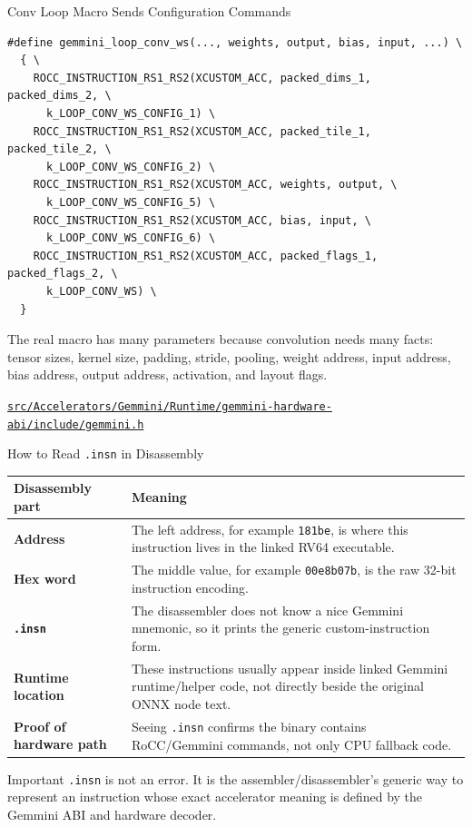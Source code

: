 \documentclass[aspectratio=169,10pt]{beamer}
\newcommand{\code}[1]{\texttt{\footnotesize #1}}
\newcommand{\repoRoot}{/home/lahcen/toolchains/onnx-mlir-xcompile/onnx-mlir}
\newcommand{\pathcode}[1]{\href{run:\repoRoot/#1}{\texttt{\scriptsize #1}}}
\newcommand{\edgeword}[1]{\textcolor{red!75!black}{\textbf{#1}}}
\begin{document}
\begin{frame}[fragile]{Conv Loop Macro Sends Configuration Commands}
  \begin{lstlisting}
#define gemmini_loop_conv_ws(..., weights, output, bias, input, ...) \
  { \
    ROCC_INSTRUCTION_RS1_RS2(XCUSTOM_ACC, packed_dims_1, packed_dims_2, \
      k_LOOP_CONV_WS_CONFIG_1) \
    ROCC_INSTRUCTION_RS1_RS2(XCUSTOM_ACC, packed_tile_1, packed_tile_2, \
      k_LOOP_CONV_WS_CONFIG_2) \
    ROCC_INSTRUCTION_RS1_RS2(XCUSTOM_ACC, weights, output, \
      k_LOOP_CONV_WS_CONFIG_5) \
    ROCC_INSTRUCTION_RS1_RS2(XCUSTOM_ACC, bias, input, \
      k_LOOP_CONV_WS_CONFIG_6) \
    ROCC_INSTRUCTION_RS1_RS2(XCUSTOM_ACC, packed_flags_1, packed_flags_2, \
      k_LOOP_CONV_WS) \
  }
  \end{lstlisting}
  \scriptsize
  The real macro has many parameters because convolution needs many facts:
  tensor sizes, kernel size, padding, stride, pooling, weight address, input address, bias address, output address, activation, and layout flags.

  \vspace{0.25em}
  \pathcode{src/Accelerators/Gemmini/Runtime/gemmini-hardware-abi/include/gemmini.h}
\end{frame}

\begin{frame}{How to Read \code{.insn} in Disassembly}
  \scriptsize
  \begin{tabularx}{\textwidth}{@{}lX@{}}
    \toprule
    Disassembly part & Meaning \\
    \midrule
    \edgeword{Address} & The left address, for example \code{181be}, is where this instruction lives in the linked RV64 executable. \\
    \edgeword{Hex word} & The middle value, for example \code{00e8b07b}, is the raw 32-bit instruction encoding. \\
    \edgeword{\code{.insn}} & The disassembler does not know a nice Gemmini mnemonic, so it prints the generic custom-instruction form. \\
    \edgeword{Runtime location} & These instructions usually appear inside linked Gemmini runtime/helper code, not directly beside the original ONNX node text. \\
    \edgeword{Proof of hardware path} & Seeing \code{.insn} confirms the binary contains RoCC/Gemmini commands, not only CPU fallback code. \\
    \bottomrule
  \end{tabularx}

  \vspace{0.45em}
  \begin{block}{Important}
    \code{.insn} is not an error. It is the assembler/disassembler's generic way to represent an instruction whose exact accelerator meaning is defined by the Gemmini ABI and hardware decoder.
  \end{block}
\end{frame}
\end{document}

